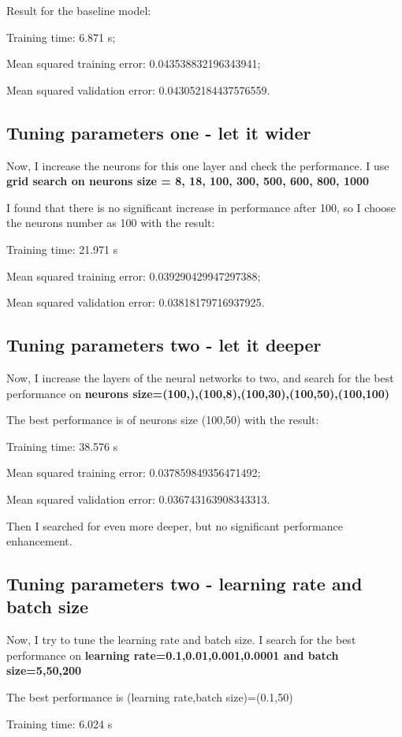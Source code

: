 \documentclass[12pt]{article}
\numberwithin{equation}{section}
\begin{document}
Result for the baseline model:

Training time: 6.871 s;

Mean squared training error: 0.043538832196343941;

Mean squared validation error:  0.043052184437576559.

\subsection{Tuning parameters one - let it wider}
Now, I increase the neurons for this one layer and check the performance.
I use \textbf{grid search on neurons size = 8, 18, 100, 300, 500, 600, 800, 1000}

I found that there is no significant increase in performance after 100, so I choose the neurons number as 100 with the result:

Training time: 21.971 s

Mean squared training error: 0.039290429947297388;

Mean squared validation error: 0.03818179716937925.

\subsection{Tuning parameters two - let it deeper}
Now, I increase the layers of the neural networks to two, and search for the best performance on \textbf{neurons size=(100,),(100,8),(100,30),(100,50),(100,100)}

The best performance is of neurons size (100,50) with the result:

Training time: 38.576 s

Mean squared training error: 0.037859849356471492;

Mean squared validation error: 0.036743163908343313.

Then I searched for even more deeper, but no significant performance enhancement.

\subsection{Tuning parameters two - learning rate and batch size}
Now, I try to tune the learning rate and batch size. I search for the best performance on \textbf{learning rate=0.1,0.01,0.001,0.0001 and batch size=5,50,200}

The best performance is (learning rate,batch size)=(0.1,50)

Training time: 6.024 s
\end{document}

